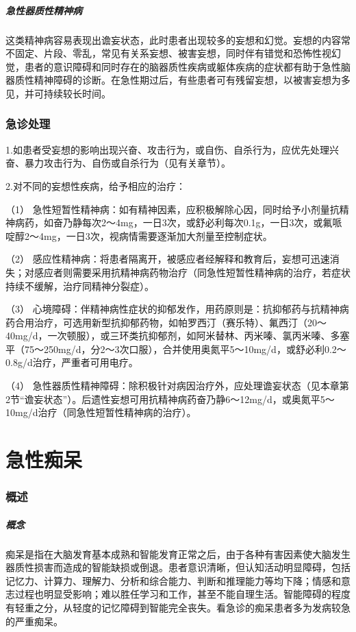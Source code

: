 \subparagraph{急性器质性精神病}

这类精神病容易表现出谵妄状态，此时患者出现较多的妄想和幻觉。妄想的内容常不固定、片段、零乱，常见有关系妄想、被害妄想，同时伴有错觉和恐怖性视幻觉，患者的意识障碍和同时存在的脑器质性疾病或躯体疾病的症状都有助于急性脑器质性精神障碍的诊断。在急性期过后，有些患者可有残留妄想，以被害妄想为多见，并可持续较长时间。

\subsubsection{急诊处理}

1.如患者受妄想的影响出现兴奋、攻击行为，或自伤、自杀行为，应优先处理兴奋、暴力攻击行为、自伤或自杀行为（见有关章节）。

2.对不同的妄想性疾病，给予相应的治疗：

（1）
急性短暂性精神病：如有精神因素，应积极解除心因，同时给予小剂量抗精神病药，如奋乃静每次2～4mg，一日3次，或舒必利每次0.1g，一日3次，或氟哌啶醇2～4mg，一日3次，视病情需要逐渐加大剂量至控制症状。

（2）
感应性精神病：将患者隔离开，被感应者经解释和教育后，妄想可迅速消失；对感应者则需要采用抗精神病药物治疗（同急性短暂性精神病的治疗，若症状持续不缓解，治疗同精神分裂症）。

（3）
心境障碍：伴精神病性症状的抑郁发作，用药原则是：抗抑郁药与抗精神病药合用治疗，可选用新型抗抑郁药物，如帕罗西汀（赛乐特）、氟西汀（20～40mg/d，一次顿服），或三环类抗抑郁剂，如阿米替林、丙米嗪、氯丙米嗪、多塞平（75～250mg/d，分2～3次口服），合并使用奥氮平5～10mg/d，或舒必利0.2～0.8g/d治疗，严重者可用电疗。

（4）
急性器质性精神障碍：除积极针对病因治疗外，应处理谵妄状态（见本章第2节“谵妄状态”）。后遗性妄想可用抗精神病药奋乃静6～12mg/d，或奥氮平5～10mg/d治疗（同急性短暂性精神病的治疗）。

\protect\hypertarget{text00050.html}{}{}

\section{急性痴呆}

\subsubsection{概述}

\subparagraph{概念}

痴呆是指在大脑发育基本成熟和智能发育正常之后，由于各种有害因素使大脑发生器质性损害而造成的智能缺损或倒退。患者意识清晰，但认知活动明显障碍，包括记忆力、计算力、理解力、分析和综合能力、判断和推理能力等均下降；情感和意志过程也明显受影响；难以胜任学习和工作，甚至不能自理生活。智能障碍的程度有轻重之分，从轻度的记忆障碍到智能完全丧失。看急诊的痴呆患者多为发病较急的严重痴呆。


